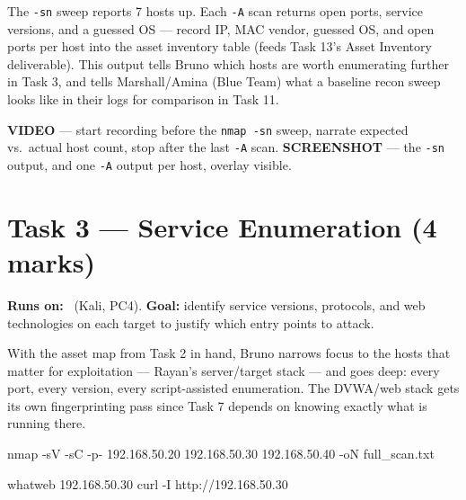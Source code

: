 \documentclass[11pt,a4paper]{article}
\begin{document}
\begin{expectbox}
The \texttt{-sn} sweep reports 7 hosts up. Each \texttt{-A} scan returns open
ports, service versions, and a guessed OS --- record IP, MAC vendor, guessed OS, and
open ports per host into the asset inventory table (feeds Task 13's Asset Inventory
deliverable). This output tells Bruno which hosts are worth enumerating further in
Task 3, and tells Marshall/Amina (Blue Team) what a baseline recon sweep looks like in
their logs for comparison in Task 11.
\end{expectbox}

\begin{notebox}
\textbf{VIDEO} --- start recording before the \texttt{nmap -sn} sweep, narrate expected
vs.\ actual host count, stop after the last \texttt{-A} scan. \textbf{SCREENSHOT} ---
the \texttt{-sn} output, and one \texttt{-A} output per host, overlay visible.
\end{notebox}

\clearpage

\section{Task 3 --- Service Enumeration (4 marks)}
\textbf{Runs on:} \bruno\ (Kali, PC4). \quad\textbf{Goal:} identify service versions,
protocols, and web technologies on each target to justify which entry points to attack.

\begin{redbox}
With the asset map from Task 2 in hand, Bruno narrows focus to the hosts that matter
for exploitation --- Rayan's server/target stack --- and goes deep: every port, every
version, every script-assisted enumeration. The DVWA/web stack gets its own
fingerprinting pass since Task 7 depends on knowing exactly what is running there.
\end{redbox}

\begin{cmdbox}
\begin{cmdverb}
nmap -sV -sC -p- 192.168.50.20 192.168.50.30 192.168.50.40 -oN full_scan.txt
\end{cmdverb}
\end{cmdbox}

\begin{cmdbox}
\begin{cmdverb}
whatweb 192.168.50.30
curl -I http://192.168.50.30
\end{cmdverb}
\end{cmdbox}
\end{document}

